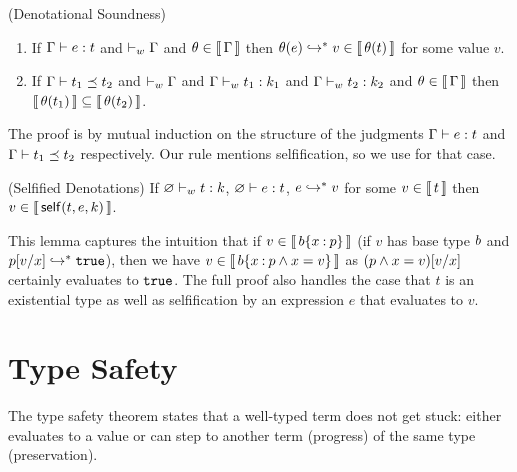 \begin{theorem}\label{lem:denote-sound-first}
\label{denote-sound} (Denotational Soundness)
\begin{enumerate}
\item If $\hastype{\tcenv}{e}{t}$
      and $\isWellFormedE{\tcenv}$
      and $\theta \in \denote{\tcenv}$
      then $\evalsTo{\theta(e)}{v} \in \denote{\theta(t)}$ for some value $v$.
\item If $\isSubType{\tcenv}{t_1}{t_2}$
      and $\isWellFormedE{\tcenv}$
      and $\isWellFormed{\tcenv}{t_1}{k_1}$
      and $\isWellFormed{\tcenv}{t_2}{k_2}$ and $\theta \in \denote{\tcenv}$ then $\denote{\theta(t_1)} \subseteq\denote{\theta(t_2)}$.
\end{enumerate}
\end{theorem}

The proof is by mutual induction
on the structure of the judgments
$\hastype{\tcenv}{e}{t}$ and
$\isSubType{\tcenv}{t_1}{t_2}$ respectively.
%
Our rule \tVar mentions selfification,
so we use 
for that case.

\begin{lemma}\label{denote-selfification} (Selfified Denotations)
    If $\isWellFormed{\varnothing}{\stype}{\skind}$,
       $\hastype{\varnothing}{\sexpr}{\stype}$,
       $\evalsTo{\sexpr}{\sval}$ for some $\sval \in \denote{\stype}$
    then $\sval \in \denote{\self{t}{e}{k}}$.
\end{lemma}

This lemma captures the intuition
that if $v \in \denote{\breft{\sbase}{x}{p}}$
(\ie if $v$ has base type $\sbase$
and $\evalsTo{\subst{p}{x}{v}}{\ttrue}$),
then we have $v \in \denote{\breft{\sbase}{x}{ p \wedge x = v}}$
as $\subst{(p \wedge x=v)}{x}{v}$ certainly evaluates to $\ttrue$.
%
The full proof also handles the case that $t$
is an existential type as well as selfification
by an expression $e$ that evaluates to $v$.



\section{Type Safety}
\label{sec:soundness:safety}

The type safety theorem  states that a well-typed 
term does not get stuck: \ie either 
evaluates to a value or can step 
to another term (progress) 
of the same type (preservation).
%

